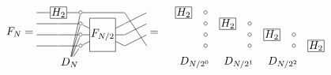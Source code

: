 \begin{align*}
F_N =
\begin{tikzpicture}[baseline=-2em, x=2em, y=1em, inner sep=1pt]
    \node[rectangle,draw] (H) at (0,0) {$H_2$};
    \node[inner sep=0pt, minimum size=0pt] (l1) at (0,-1) {};
    \node[inner sep=0pt, minimum size=0pt] (l2) at (0,-2) {};
    \node[inner sep=0pt, minimum size=0pt] (l3) at (0,-3) {};
    \node[inner sep=0pt, minimum size=0pt] (L0) at (-1,0) {};
    \node[inner sep=0pt, minimum size=0pt] (L1) at (-1,-1) {};
    \node[inner sep=0pt, minimum size=0pt] (L2) at (-1,-2) {};
    \node[inner sep=0pt, minimum size=0pt] (L3) at (-1,-3) {};
    \node[inner sep=0pt, minimum size=0pt] (b0) at (1,0) {$\sbullet$};
    \node[inner sep=0pt, minimum size=0pt] (b1) at (1,-1) {$\sbullet$};
    \node[inner sep=0pt, minimum size=0pt] (b2) at (1,-2) {$\sbullet$};
    \node[inner sep=0pt, minimum size=0pt] (b3) at (1,-3) {$\sbullet$};
    \node (D) at (.5,-4.5) {$D_N$};
    \node[rectangle,draw,minimum height=3em] (F) at (2,-2) {$F_{N/2}$};
    \node[inner sep=0pt, minimum size=0pt] (r0) at (4,0) {};
    \node[inner sep=0pt, minimum size=0pt] (r1) at (4,-1) {};
    \node[inner sep=0pt, minimum size=0pt] (r2) at (4,-2) {};
    \node[inner sep=0pt, minimum size=0pt] (r3) at (4,-3) {};
    \node[inner sep=0pt, minimum size=0pt] (s0) at (3,0) {};
    \node[inner sep=0pt, minimum size=0pt] (s1) at (3,-1) {};
    \node[inner sep=0pt, minimum size=0pt] (s2) at (3,-2) {};
    \node[inner sep=0pt, minimum size=0pt] (s3) at (3,-3) {};
    \draw (b0) -- (D);
    \draw (b1) -- (D);
    \draw (b2) -- (D);
    \draw (b3) -- (D);
    \draw (L0) -- (H) -- (b0) -- (s0) -- (r3);
    \draw (L1) -- (l1) -- (b1) -- (F) -- (s1) -- (r0);
    \draw (L2) -- (l2) -- (b2) -- (F) -- (s2) -- (r1);
    \draw (L3) -- (l3) -- (b3) -- (F) -- (s3) -- (r2);
\end{tikzpicture}
&=
\begin{tikzpicture}[baseline=-2em, x=2em, y=1em, inner sep=1pt]
    \foreach \i in {0,...,3} {
        \node[rectangle,draw] (H\i) at (2*\i,-\i) {$H_2$};
        \node[inner sep=0pt, minimum size=0pt] (l\i) at (0,-\i) {};
        \node[inner sep=0pt, minimum size=0pt] (L\i) at (-1,-\i) {};
        \node[inner sep=0pt, minimum size=0pt] (s\i) at (7,-\i) {};
        \node[inner sep=0pt, minimum size=0pt] (r\i) at (8,-\i) {};
    }
    \foreach \i in {0, 1, 2} {
        \node (D\i) at (0.5+\i*2,-4.5) {$D_{N/2^\i}$};
        \foreach \k in {\i,...,3} {
            \node[inner sep=0pt, minimum size=0pt] (b\i\k) at (1+\i*2,-\k) {$\sbullet$};
}}
\end{tikzpicture}
\end{align*}
